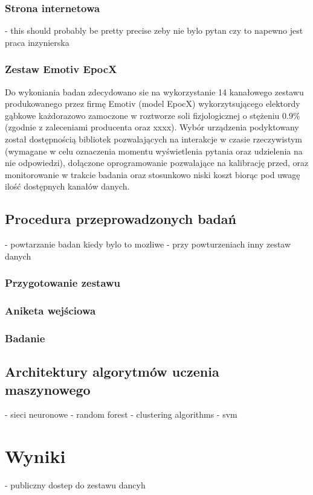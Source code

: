 \documentclass{./assets/wfis}
\begin{document}
\subsection{Strona internetowa}
- this should probably be pretty precise zeby nie bylo pytan czy to napewno jest praca inzynierska
\subsection{Zestaw Emotiv EpocX}\label{emotiv}

Do wykoniania badan zdecydowano sie na wykorzystanie 14 kanałowego zestawu produkowanego przez firmę Emotiv (model EpocX) wykorzytsującego elektordy gąbkowe każdorazowo zamoczone w roztworze soli fizjologicznej o stężeniu $0.9\%$ (zgodnie z zaleceniami producenta \cite{} oraz xxxx). Wybór urządzenia podyktowany został dostępnością bibliotek pozwalających na interakcje w czasie rzeczywistym (wymagane w celu oznaczenia momentu wyświetlenia pytania oraz udzielenia na nie odpowiedzi), dołączone oprogramowanie pozwalające na kalibrację przed, oraz monitorowanie w trakcie badania oraz stosunkowo niski koszt biorąc pod uwagę ilość dostępnych kanałów danych.

\section{Procedura przeprowadzonych badań}\label{procedura-badan}
- powtarzanie badan kiedy bylo to mozliwe
- przy powturzeniach inny zestaw danych
\subsection{Przygotowanie zestawu}
\subsection{Aniketa wejściowa}
\subsection{Badanie}

\section{Architektury algorytmów uczenia maszynowego}
- sieci neuronowe
- random forest
- clustering algorithms
- svm

\chapter{Wyniki}
- publiczny dostep do zestawu dancyh
\end{document}
